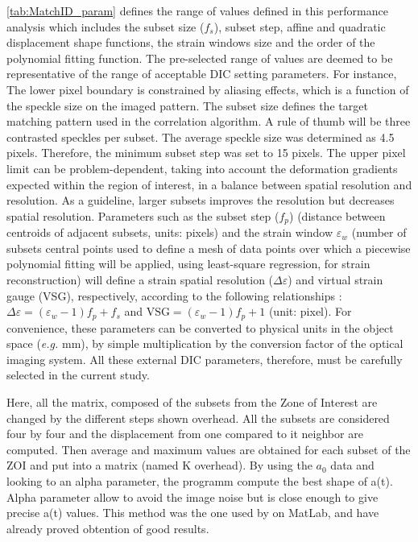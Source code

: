 \documentclass[3p,times,procedia]{elsarticle}
\begin{document}
\ref{tab:MatchID_param} defines the range of values defined in this performance analysis which includes the subset size ($f_s$), subset step, affine and quadratic displacement shape functions, the strain windows size and the order of the polynomial fitting function. The pre-selected range of values are deemed to be representative of the range of acceptable DIC setting parameters. For instance, The lower pixel boundary is constrained by aliasing effects, which is a function of the speckle size on the imaged pattern. The subset size defines the target matching pattern used in the correlation algorithm. A rule of thumb will be three contrasted speckles per subset. The average speckle size was determined as 4.5 pixels. Therefore, the minimum subset step was set to 15 pixels. The upper pixel limit can be problem-dependent, taking into account the deformation gradients expected within the region of interest, in a balance between spatial resolution and resolution. As a guideline, larger subsets improves the resolution but decreases spatial resolution. Parameters such as the subset step ($f_p$) (distance between centroids of adjacent subsets, units: pixels) and the strain window $\varepsilon_w$ (number of subsets central points used to define a mesh of data points over which a piecewise polynomial fitting will be applied, using least-square regression, for strain reconstruction) will define a strain spatial resolution ($\Delta \varepsilon$) and virtual strain gauge (VSG), respectively, according to the following relationships \cite{Lava2013576,Pereira2018566}: $\Delta \varepsilon = (\varepsilon_w-1)f_p + f_s$ and $\mbox{VSG} = (\varepsilon_w-1)f_p + 1$ (unit: pixel). For convenience, these parameters can be converted to physical units in the object space (\textit{e.g.} mm), by simple multiplication by the conversion factor of the optical imaging system. All these external DIC parameters, therefore, must be carefully selected in the current study.


Here, all the matrix, composed of the subsets from the Zone of Interest are changed by the different steps shown overhead. All the subsets are considered four by four and the displacement from one compared to it neighbor are computed. Then average and maximum values are obtained for each subset of the ZOI and put into a matrix (named K overhead). By using the $a_{0}$ data and looking to an alpha parameter, the programm compute the best shape of a(t). Alpha parameter allow to avoid the image noise but is close enough to give precise a(t) values.
This method was the one used by \cite{Reference14} on MatLab, and have already proved obtention of good results.
\end{document}
